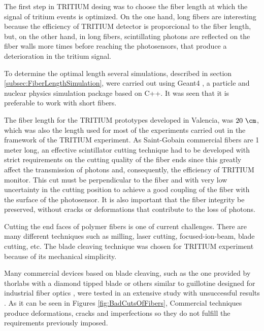 The first step in TRITIUM desing was to choose the fiber length at which the signal of tritium events is optimized. On the one hand, long fibers are interesting because the efficiency of TRITIUM detector is proporcional to the fiber length, but, on the other hand, in long fibers, scintillating photons are reflected on the fiber walls more times before reaching the photosensors, that produce a deterioration in the tritium signal.

To determine the optimal length several simulations, described in section \ref{subsec:FiberLengthSimulation}, were carried out using Geant4 \cite{Geant4WebPage}, a particle and nuclear physics simulation package based on C++. It was seen that it is preferable to work with short fibers.

The fiber length for the TRITIUM prototypes developed in Valencia, was $20~\cm$, which was also the length used for most of the experiments carried out in the framework of the TRITIUM experiment. As Saint-Gobain commercial fibers are 1 meter long, an effective scintillator cutting technique had to be developed with strict requirements on the cutting quality of the fiber ends since this greatly affect the transmission of photons and, consequently, the efficiency of TRITIUM monitor. This cut must be perpendicular to the fiber and with very low uncertainty in the cutting position to achieve a good coupling of the fiber with the surface of the photosensor. It is also important that the fiber integrity be preserved, without cracks or deformations that contribute to the loss of photons.

Cutting the end faces of polymer fibers is one of current challenges. There are many different techniques such as milling, laser cutting, focused-ion-beam, blade cutting, etc. The blade cleaving technique was chosen for TRITIUM experiment because of its mechanical simplicity. %

Many commercial devices based on blade cleaving, such as the one provided by thorlabs with a diamond tipped blade \cite{DiamondThorlabs} or others similar to guillotine designed for industrial fiber optics \cite{GuillotineIFO}, were tested in an extensive study with unsuccessful results \cite{TFGAlberto}. As it can be seen in Figures \ref{fig:BadCutsOfFibers}, Commercial techniques produce deformations, cracks and imperfections so they do not fulfill the requirements previously imposed.

